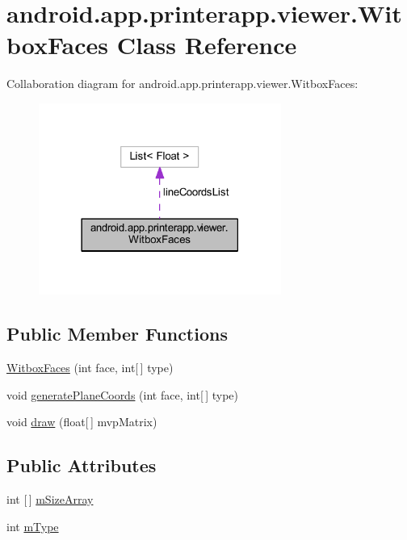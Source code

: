 \hypertarget{classandroid_1_1app_1_1printerapp_1_1viewer_1_1_witbox_faces}{}\section{android.\+app.\+printerapp.\+viewer.\+Witbox\+Faces Class Reference}
\label{classandroid_1_1app_1_1printerapp_1_1viewer_1_1_witbox_faces}


Collaboration diagram for android.\+app.\+printerapp.\+viewer.\+Witbox\+Faces\+:
\nopagebreak
\begin{figure}[H]
\begin{center}
\leavevmode
\includegraphics[width=225pt]{classandroid_1_1app_1_1printerapp_1_1viewer_1_1_witbox_faces__coll__graph}
\end{center}
\end{figure}
\subsection*{Public Member Functions}
\begin{DoxyCompactItemize}
\item 
\hyperlink{classandroid_1_1app_1_1printerapp_1_1viewer_1_1_witbox_faces_af3636919042bba77eff697271eb564fb}{Witbox\+Faces} (int face, int\mbox{[}$\,$\mbox{]} type)
\item 
void \hyperlink{classandroid_1_1app_1_1printerapp_1_1viewer_1_1_witbox_faces_a6b0a909c0b3dbb35abcadd32c8a10529}{generate\+Plane\+Coords} (int face, int\mbox{[}$\,$\mbox{]} type)
\item 
void \hyperlink{classandroid_1_1app_1_1printerapp_1_1viewer_1_1_witbox_faces_a1c7f3835324871a97a8d03ed0ce497a6}{draw} (float\mbox{[}$\,$\mbox{]} mvp\+Matrix)
\end{DoxyCompactItemize}
\subsection*{Public Attributes}
\begin{DoxyCompactItemize}
\item 
int \mbox{[}$\,$\mbox{]} \hyperlink{classandroid_1_1app_1_1printerapp_1_1viewer_1_1_witbox_faces_a8a79edbdd8cbff578b186af1da62d8bb}{m\+Size\+Array}
\item 
int \hyperlink{classandroid_1_1app_1_1printerapp_1_1viewer_1_1_witbox_faces_a2d370ae84a6e6ee4817a06228e931da9}{m\+Type}
\end{DoxyCompactItemize}
